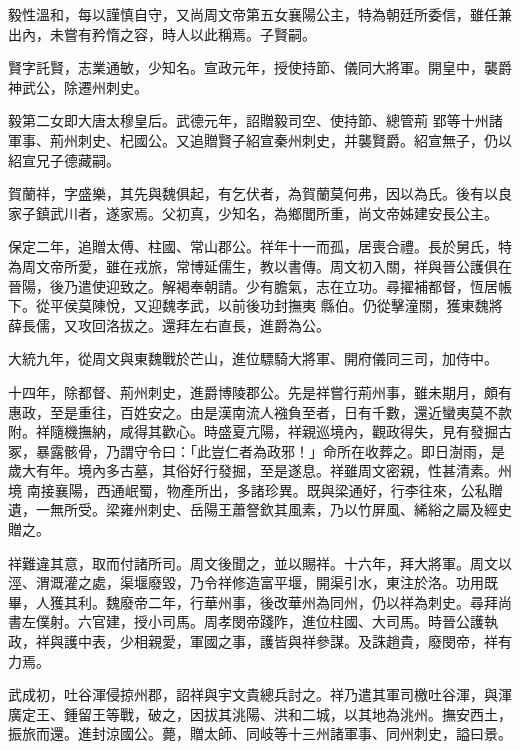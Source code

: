 \begin{pinyinscope}
 毅性溫和，每以謹慎自守，又尚周文帝第五女襄陽公主，特為朝廷所委信，雖任兼出內，未嘗有矜惰之容，時人以此稱焉。子賢嗣。



 賢字託賢，志業通敏，少知名。宣政元年，授使持節、儀同大將軍。開皇中，襲爵神武公，除遷州刺史。



 毅第二女即大唐太穆皇后。武德元年，詔贈毅司空、使持節、總管荊
 郢等十州諸軍事、荊州刺史、杞國公。又追贈賢子紹宣秦州刺史，并襲賢爵。紹宣無子，仍以紹宣兄子德藏嗣。



 賀蘭祥，字盛樂，其先與魏俱起，有乞伏者，為賀蘭莫何弗，因以為氏。後有以良家子鎮武川者，遂家焉。父初真，少知名，為鄉閭所重，尚文帝姊建安長公主。



 保定二年，追贈太傅、柱國、常山郡公。祥年十一而孤，居喪合禮。長於舅氏，特為周文帝所愛，雖在戎旅，常博延儒生，教以書傳。周文初入關，祥與晉公護俱在晉陽，後乃遣使迎致之。解褐奉朝請。少有膽氣，志在立功。尋擢補都督，恆居帳下。從平侯莫陳悅，又迎魏孝武，以前後功封撫夷
 縣伯。仍從擊潼關，獲東魏將薛長儒，又攻回洛拔之。還拜左右直長，進爵為公。



 大統九年，從周文與東魏戰於芒山，進位驃騎大將軍、開府儀同三司，加侍中。



 十四年，除都督、荊州刺史，進爵博陵郡公。先是祥嘗行荊州事，雖未期月，頗有惠政，至是重往，百姓安之。由是漢南流人襁負至者，日有千數，還近蠻夷莫不款附。祥隨機撫納，咸得其歡心。時盛夏亢陽，祥親巡境內，觀政得失，見有發掘古冢，暴露骸骨，乃謂守令曰：「此豈仁者為政邪！」命所在收葬之。即日澍雨，是歲大有年。境內多古墓，其俗好行發掘，至是遂息。祥雖周文密親，性甚清素。州境
 南接襄陽，西通岷蜀，物產所出，多諸珍異。既與梁通好，行李往來，公私贈遺，一無所受。梁雍州刺史、岳陽王蕭詧欽其風素，乃以竹屏風、絺綌之屬及經史贈之。



 祥難違其意，取而付諸所司。周文後聞之，並以賜祥。十六年，拜大將軍。周文以涇、渭溉灌之處，渠堰廢毀，乃令祥修造富平堰，開渠引水，東注於洛。功用既畢，人獲其利。魏廢帝二年，行華州事，後改華州為同州，仍以祥為刺史。尋拜尚書左僕射。六官建，授小司馬。周孝閔帝踐阼，進位柱國、大司馬。時晉公護執政，祥與護中表，少相親愛，軍國之事，護皆與祥參謀。及誅趙貴，廢閔帝，祥有力焉。



 武成初，吐谷渾侵掠州郡，詔祥與宇文貴總兵討之。祥乃遣其軍司檄吐谷渾，與渾廣定王、鍾留王等戰，破之，因拔其洮陽、洪和二城，以其地為洮州。撫安西土，振旅而還。進封涼國公。薨，贈太師、同岐等十三州諸軍事、同州刺史，謚曰景。




\end{pinyinscope}
